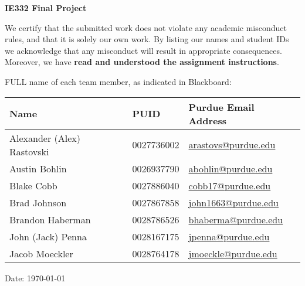\documentclass[11pt]{article}
\begin{document}
\vspace*{0.5in}

\begin{center}
\Huge{{\bf IE332 Final Project}}
\end{center}

\vspace{0.3in}

\noindent We certify that the submitted work does not violate any academic misconduct rules, and that it is solely our own work. By listing our names and student IDs we acknowledge that any misconduct will result in appropriate consequences.  Moreover, we have {\bf read and understood the assignment instructions}.

\vspace{0.2in}


\vspace{0.3in}

\begin{flushleft}
FULL name of each team member, as indicated in Blackboard:
\begin{table}[h]
\centering
\begin{tabular}{l|l|l}
Name                       & PUID       & Purdue Email Address                                    \\ \hline
Alexander (Alex) Rastovski & 0027736002 & \href{mailto:arastovs@purdue.edu}{arastovs@purdue.edu}  \\
Austin Bohlin              & 0026937790 & \href{mailto:abohlin@purdue.edu}{abohlin@purdue.edu}    \\
Blake Cobb                 & 0027886040 & \href{mailto:cobb17@purdue.edu}{cobb17@purdue.edu}      \\
Brad Johnson               & 0027867858 & \href{mailto:john1663@purdue.edu}{john1663@purdue.edu}  \\
Brandon Haberman           & 0028786526 & \href{mailto:bhaberma@purdue.edu}{bhaberma@purdue.edu}  \\
John (Jack) Penna          & 0028167175 & \href{mailto:jpenna@purdue.edu}{jpenna@purdue.edu}      \\
Jacob Moeckler             & 0028764178 & \href{mailto:jmoeckle@purdue.edu} {jmoeckle@purdue.edu}
\end{tabular}
\end{table}

\end{flushleft}

\vspace{0.2in}

\noindent Date: \today





% 

\renewcommand{\thepage}{}




\end{document}
